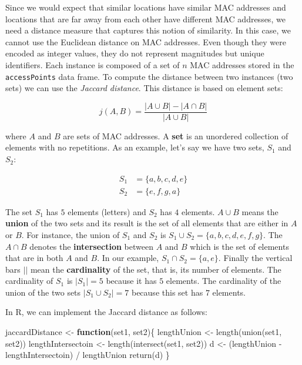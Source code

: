 \documentclass[
  11pt,
]{krantz}
\newenvironment{Shaded}{\begin{snugshade}}{\end{snugshade}}
\newcommand{\ControlFlowTok}[1]{\textcolor[rgb]{0.27,0.27,0.27}{\textbf{#1}}}
\newcommand{\FunctionTok}[1]{\textcolor[rgb]{0,0,0}{#1}}
\newcommand{\NormalTok}[1]{#1}
\newcommand{\OtherTok}[1]{\textcolor[rgb]{0.37,0.37,0.37}{#1}}
\newcommand{\SpecialCharTok}[1]{\textcolor[rgb]{0,0,0}{#1}}
\begin{document}
Since we would expect that similar locations have similar MAC addresses and locations that are far away from each other have different MAC addresses, we need a distance measure that captures this notion of similarity. In this case, we cannot use the Euclidean distance on MAC addresses. Even though they were encoded as integer values, they do not represent magnitudes but unique identifiers. Each instance is composed of a set of \(n\) MAC addresses stored in the \texttt{accessPoints} data frame. To compute the distance between two instances (two sets) we can use the \emph{Jaccard distance}. This distance is based on element sets:

\begin{equation}
  j\left(A,B\right)=\frac{\left|A\cup B\right|-\left|A\cap B\right|}{\left|A\cup B\right|}
  \label{eq:jaccardDistance}
\end{equation}

where \(A\) and \(B\) are sets of MAC addresses. A \textbf{set} is an unordered collection of elements with no repetitions. As an example, let's say we have two sets, \(S_1\) and \(S_2\):

\begin{align*}
S_1&=\{a,b,c,d,e\}\\
S_2&=\{e,f,g,a\}
\end{align*}

The set \(S_1\) has \(5\) elements (letters) and \(S_2\) has \(4\) elements. \(A \cup B\) means the \textbf{union} of the two sets and its result is the set of all elements that are either in \(A\) or \(B\). For instance, the union of \(S_1\) and \(S_2\) is \(S_1 \cup S_2 = \{a,b,c,d,e,f,g\}\). The \(A \cap B\) denotes the \textbf{intersection} between \(A\) and \(B\) which is the set of elements that are in both \(A\) and \(B\). In our example, \(S_1 \cap S_2 = \{a,e\}\). Finally the vertical bars \(||\) mean the \textbf{cardinality} of the set, that is, its number of elements. The cardinality of \(S_1\) is \(|S_1|=5\) because it has \(5\) elements. The cardinality of the union of the two sets \(|S_1 \cup S_2|=7\) because this set has \(7\) elements.

In R, we can implement the Jaccard distance as follows:

\begin{Shaded}
\begin{Highlighting}[]
\NormalTok{jaccardDistance }\OtherTok{\textless{}{-}} \ControlFlowTok{function}\NormalTok{(set1, set2)\{}
\NormalTok{  lengthUnion }\OtherTok{\textless{}{-}} \FunctionTok{length}\NormalTok{(}\FunctionTok{union}\NormalTok{(set1, set2))}
\NormalTok{  lengthIntersectoin }\OtherTok{\textless{}{-}} \FunctionTok{length}\NormalTok{(}\FunctionTok{intersect}\NormalTok{(set1, set2))}
\NormalTok{  d }\OtherTok{\textless{}{-}}\NormalTok{ (lengthUnion }\SpecialCharTok{{-}}\NormalTok{ lengthIntersectoin)  }\SpecialCharTok{/}\NormalTok{ lengthUnion}
  \FunctionTok{return}\NormalTok{(d)}
\NormalTok{\}}
\end{Highlighting}
\end{Shaded}
\end{document}
